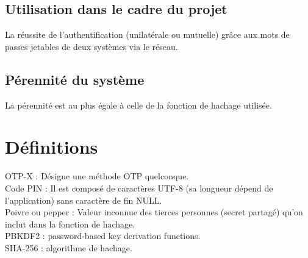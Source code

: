 \documentclass{../res/univ-projet}
\begin{document}
  \subsection{Utilisation dans le cadre du projet}
  La réussite de l'authentification (unilatérale ou mutuelle) grâce aux mots de passes jetables de deux systèmes via le réseau.
  
  \subsection{Pérennité du système}
  La pérennité est au plus égale à celle de la fonction de hachage utilisée.

\section{Définitions}
OTP-X : Désigne une méthode OTP quelconque.\\
Code PIN : Il est composé de caractères UTF-8 (sa longueur dépend de l'application) sans caractère de fin NULL.\\
Poivre ou pepper : Valeur inconnue des tierces personnes (secret partagé) qu'on inclut dans la fonction de hachage.\\
PBKDF2 : password-based key derivation functions.\\
SHA-256 : algorithme de hachage.\\
\end{document}
